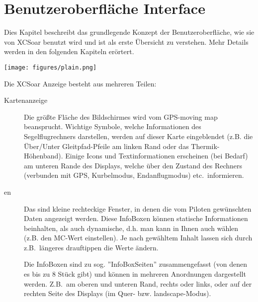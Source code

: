 \chapter{Benutzeroberfläche Interface}\label{cha:interface}

Dies Kapitel beschreibt das grundlegende  Konzept der Benutzeroberfläche, wie sie von \textsf{XCSoar} benutzt wird und ist als erste Übersicht zu verstehen. Mehr Details werden in den folgenden Kapiteln erörtert.

\begin{center}
\texttt{[image: figures/plain.png]}
\end{center}

Die  \textsf{XCSoar} Anzeige besteht aus mehreren Teilen:
\begin{description}
\item[Kartenanzeige] Die größte Fläche des Bildschirmes wird vom GPS-moving map beansprucht.
Wichtige Symbole, welche Informationen des Segelflugrechners darstellen, werden auf dieser Karte
eingeblendet (z.B. die Über/Unter Gleitpfad-Pfeile am linken Rand oder das Thermik-Höhenband).
Einige Icons und Textinformationen  erscheinen  (bei Bedarf) am unteren Rande des Displays,
welche über den Zustand des Rechners (verbunden mit GPS, Kurbelmodus, Endanflugmodus) etc.\  informieren.
%
\item[{\InfoBox}en] Das sind kleine rechteckige Fenster, in denen die vom Piloten gewünschten Daten angezeigt werden. Diese InfoBoxen können statische Informationen beinhalten, als auch dynamische, d.h. man kann in Ihnen auch wählen (z.B. den MC-Wert einstellen). Je nach gewähltem Inhalt lassen sich durch z.B.\ längeres drauftippen die Werte ändern. 

Die InfoBoxen sind zu sog. ''InfoBoxSeiten'' zusammengefasst (von denen es bis zu 8 Stück  gibt)  und können in mehreren Anordnungen dargestellt werden. Z.B.\ am oberen und unteren Rand, rechts oder links, oder auf der rechten Seite des Displays (im Quer- bzw. landscape-Modus). 


\end{description}
